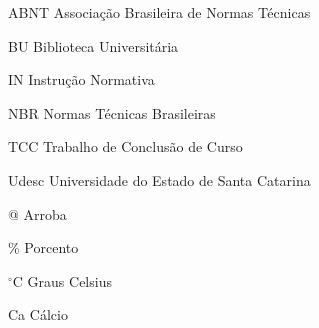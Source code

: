 
\listoffigures*
\cleardoublepage



\listoftables*
\cleardoublepage

\begin{siglas}
	\item[ABNT] Associação Brasileira de Normas Técnicas
	\item[BU] Biblioteca Universitária
	\item[IN] Instrução Normativa
	\item[NBR] Normas Técnicas Brasileiras
	\item[TCC] Trabalho de Conclusão de Curso
	\item[Udesc] Universidade do Estado de Santa Catarina
\end{siglas}



\begin{simbolos}
	\item[@] Arroba
	\item[\%] Porcento
	\item[$^\circ$C] Graus Celsius
	\item[Ca] Cálcio
\end{simbolos}

